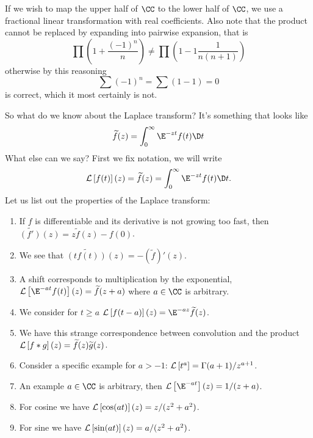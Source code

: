 \begin{rmk}[On Midterm]
If we wish to map the upper half of $\CC$ to the lower half of
$\CC$, we use a fractional linear transformation with real
coefficients. Also note that the product cannot be replaced by
expanding into pairwise expansion, that is
\begin{equation}
\prod\left(1+\frac{(-1)^{n}}{n}\right)\not=\prod\left(1-1\frac{1}{n(n+1)}\right)
\end{equation}
otherwise by this reasoning
\begin{equation}
\sum(-1)^{n}=\sum(1-1)=0
\end{equation}
is correct, which it most certainly is not.
\end{rmk}
So what do we know about the Laplace transform? It's something
that looks like
\begin{equation}
\widetilde{f}(z)=\int^{\infty}_{0}\E^{-zt}f(t)\D t
\end{equation}
What else can we say? First we fix notation, we will write
\begin{equation}
\laplace{f(t)}(z)=\widetilde{f}(z)=\int^{\infty}_{0}\E^{-zt}f(t)\D t.
\end{equation}
Let us list out the properties of the Laplace transform:
\begin{enumerate}
\item If $f$ is differentiable and its derivative is not growing
  too fast, then $\widetilde{(f')}(z)=z\widetilde{f}(z)-f(0)$.
\item We see that $\widetilde{(tf(t))}(z)=-(\widetilde{f})'(z)$.
\item A shift corresponds to multiplication by the exponential,
  $\laplace{\E^{-at}f(t)}(z)=\widetilde{f}(z+a)$ where $a\in\CC$
  is arbitrary.
\item We consider for $t\geq a$
  $\laplace{f(t-a)}(z)=\E^{-az}\widetilde{f}(z)$.
\item We have this strange correspondence between convolution and
  the product
  $\mathcal{L}\left[f*g\right](z)=\widetilde{f}(z)\widetilde{g}(z)$.
\item Consider a specific example for $a>-1$:
  $\mathcal{L}\left[t^{a}\right]=\Gamma(a+1)/z^{a+1}$. 
\item An example $a\in\CC$ is arbitrary, then
  $\laplace{\E^{-at}}(z)=1/(z+a)$. 
\item For cosine we have $\mathcal{L}\left[\cos(at)\right](z)=z/(z^{2}+a^{2})$.
\item For sine we have $\mathcal{L}\left[\sin(at)\right](z)=a/(z^{2}+a^{2})$.
\end{enumerate}

